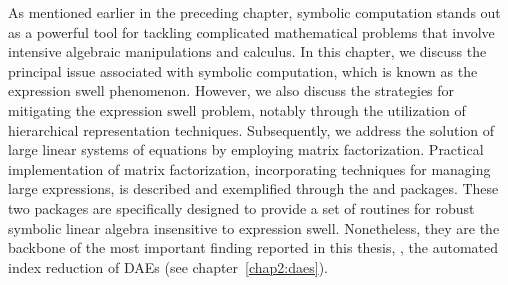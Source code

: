 %

As mentioned earlier in the preceding chapter, symbolic computation stands out as a powerful tool for tackling complicated mathematical problems that involve intensive algebraic manipulations and calculus. In this chapter, we discuss the principal issue associated with symbolic computation, which is known as the expression swell phenomenon. However, we also discuss the strategies for mitigating the expression swell problem, notably through the utilization of hierarchical representation techniques. Subsequently, we address the solution of large linear systems of equations by employing matrix factorization. Practical implementation of matrix factorization, incorporating techniques for managing large expressions, is described and exemplified through the \LEM{} and \LAST{} packages. These two \Maple{} packages are specifically designed to provide a set of routines for robust symbolic linear algebra insensitive to expression swell. Nonetheless, they are the backbone of the most important finding reported in this thesis, \ie{}, the automated index reduction of \acp{DAE} (see chapter~\ref{chap2:daes}).

